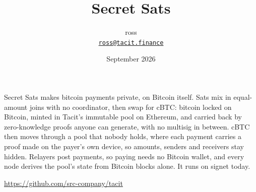 \documentclass[11pt,letterpaper]{article}
\title{Secret Sats}
\author{ross \\ \small\href{mailto:ross@tacit.finance}{\texttt{ross@tacit.finance}}}
\date{September 2026}
\begin{document}
\maketitle
\thispagestyle{empty}

Secret Sats makes bitcoin payments private, on Bitcoin itself.
Sats mix in equal-amount joins with no coordinator, then swap for cBTC: bitcoin locked on Bitcoin, minted
in Tacit's immutable pool on Ethereum, and carried back by zero-knowledge proofs anyone can generate, with
no multisig in between.
cBTC then moves through a pool that nobody holds, where each payment carries a proof made on the payer's
own device, so amounts, senders and receivers stay hidden.
Relayers post payments, so paying needs no Bitcoin wallet, and every node derives the pool's state from
Bitcoin blocks alone.
It runs on signet today.

\vfill
\begin{center}
\small\url{https://github.com/src-company/tacit}
\end{center}
\end{document}

